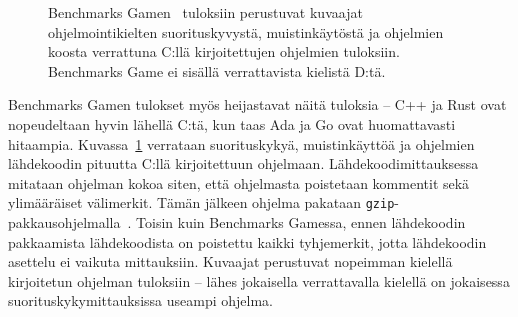 \begin{figure}[ht!]
    \begin{adjustbox}{center}
    \begin{minipage}{1.15\textwidth}
    \begin{minipage}{0.5\textwidth}
        
        \vspace*{-0.8cm}
    \end{minipage}
    \begin{minipage}{0.5\textwidth}
        
        \vspace*{-0.9cm}
    \end{minipage}
    \end{minipage}
    \end{adjustbox}
    \begin{adjustbox}{center}
    \begin{minipage}{1.15\textwidth}
    \begin{adjustbox}{center}
    \begin{minipage}{0.5\textwidth}
        
        \vspace*{-0.8cm}
    \end{minipage}
    \end{adjustbox}
    \end{minipage}
    \end{adjustbox}
    \caption{
        Benchmarks Gamen~\citep[tiedot haettu 10.1.2019]{benchmarks} tuloksiin
        perustuvat kuvaajat ohjelmointikielten suorituskyvystä, muistinkäytöstä
        ja ohjelmien koosta verrattuna C:llä kirjoitettujen ohjelmien
        tuloksiin. Benchmarks Game ei sisällä verrattavista kielistä D:tä.}
    \label{fig:benchmarksgame}
\end{figure}

Benchmarks Gamen tulokset myös heijastavat näitä tuloksia -- C++ ja Rust ovat
nopeudeltaan hyvin lähellä C:tä, kun taas Ada ja Go ovat huomattavasti
hitaampia. Kuvassa~\ref{fig:benchmarksgame} verrataan suorituskykyä,
muistinkäyttöä ja ohjelmien lähdekoodin pituutta C:llä kirjoitettuun ohjelmaan.
Lähdekoodimittauksessa mitataan ohjelman kokoa siten, että ohjelmasta
poistetaan kommentit sekä ylimääräiset välimerkit. Tämän jälkeen ohjelma
pakataan \texttt{gzip}-pakkausohjelmalla~\citep{howmeasured}. Toisin kuin
Benchmarks Gamessa, ennen lähdekoodin pakkaamista lähdekoodista on poistettu
kaikki tyhjemerkit, jotta lähdekoodin asettelu ei vaikuta mittauksiin. Kuvaajat
perustuvat nopeimman kielellä kirjoitetun ohjelman tuloksiin -- lähes
jokaisella verrattavalla kielellä on jokaisessa suorituskykymittauksissa
useampi ohjelma.

